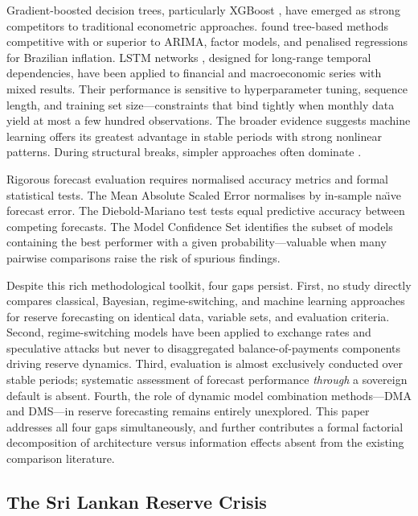 \documentclass[12pt,a4paper]{article}
\begin{document}
Gradient-boosted decision trees, particularly XGBoost \citep{ChenGuestrin2016}, have emerged as strong competitors to traditional econometric approaches. \cite{MedeirosVasconcelosVeigaZilberman2021} found tree-based methods competitive with or superior to ARIMA, factor models, and penalised regressions for Brazilian inflation. LSTM networks \citep{HochreiterSchmidhuber1997}, designed for long-range temporal dependencies, have been applied to financial and macroeconomic series with mixed results. Their performance is sensitive to hyperparameter tuning, sequence length, and training set size---constraints that bind tightly when monthly data yield at most a few hundred observations. The broader evidence suggests machine learning offers its greatest advantage in stable periods with strong nonlinear patterns. During structural breaks, simpler approaches often dominate \citep{RichardsonMulderVehbi2021}.

Rigorous forecast evaluation requires normalised accuracy metrics and formal statistical tests. The Mean Absolute Scaled Error \citep{HyndmanKoehler2006} normalises by in-sample na\"{\i}ve forecast error. The Diebold-Mariano test \citep{DieboldMariano1995} tests equal predictive accuracy between competing forecasts. The Model Confidence Set \citep{HansenLundeNason2011} identifies the subset of models containing the best performer with a given probability---valuable when many pairwise comparisons raise the risk of spurious findings.

Despite this rich methodological toolkit, four gaps persist. First, no study directly compares classical, Bayesian, regime-switching, and machine learning approaches for reserve forecasting on identical data, variable sets, and evaluation criteria. Second, regime-switching models have been applied to exchange rates and speculative attacks but never to disaggregated balance-of-payments components driving reserve dynamics. Third, evaluation is almost exclusively conducted over stable periods; systematic assessment of forecast performance \textit{through} a sovereign default is absent. Fourth, the role of dynamic model combination methods---DMA and DMS---in reserve forecasting remains entirely unexplored. This paper addresses all four gaps simultaneously, and further contributes a formal factorial decomposition of architecture versus information effects absent from the existing comparison literature.

\subsection{The Sri Lankan Reserve Crisis}
\end{document}
